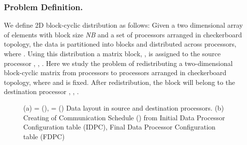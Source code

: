 \documentclass[letterpaper]{llncs}
\begin{document}
\subsubsection{Problem Definition.}
We define 2D block-cyclic distribution as follows: Given a two dimensional array of  elements with block size \textit{NB} 
and a set of  processors arranged in checkerboard topology, the data is partitioned into  blocks 
and distributed across   processors, where .
Using this distribution a matrix block, , is assigned to the source processor , , .
Here we study the problem of redistributing a two-dimensional block-cyclic matrix from  processors to 
 processors arranged in checkerboard topology, where  and  is fixed. After redistribution, the block 
 will belong  to the destination processor , , .

\begin{figure}[!ht]
\flushleft
{}
\caption{(a)  =  (),  =  ()  Data layout in source and destination proce\-ssors. (b) Creating of Communication Schedule () from
Initial Data Processor Configuration table (IDPC), Final Data Processor Configuration table (FDPC)}
\end{figure}
\end{document}
